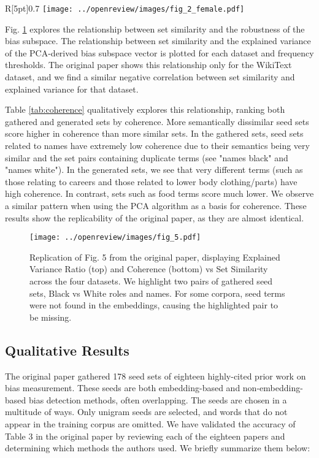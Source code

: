 \begin{wrapfigure}{R}[5pt]{0.7\textwidth}
	\centering
	\texttt{[image: ../openreview/images/fig\_2\_female.pdf]}
	\caption{\label{fig:repro_2}Reproduction of Fig. 2. Displaying the cosine similarity between the averaged vector of \textit{unpleasantness} across all 20 bootstrapped models and different seeds sets of the category \textit{female}.}
\end{wrapfigure}

Fig. \ref{fig:repro_5} explores the relationship between set similarity and the robustness of the
bias subspace. The relationship between set similarity and the explained variance of the PCA-derived
bias subspace vector is plotted for each dataset and frequency thresholds. The original paper shows
this relationship only for the WikiText dataset, and we find a similar negative correlation between
set similarity and explained variance for that dataset.

Table \ref{tab:coherence} qualitatively explores this relationship, ranking both gathered and
generated sets by coherence. More semantically dissimilar seed sets score higher in coherence than
more similar sets. In the gathered sets, seed sets related to names have extremely low coherence due
to their semantics being very similar and the set pairs containing duplicate terms (see "names
black" and "names white"). In the generated sets, we see that very different terms (such as those
relating to careers and those related to lower body clothing/parts) have high coherence. In
contrast, sets such as food terms score much lower. We observe a similar pattern when using the PCA
algorithm as a basis for coherence. These results show the replicability of the original paper, as
they are almost identical.

\begin{figure}[b]
	\centering
	\texttt{[image: ../openreview/images/fig\_5.pdf]}
	\caption{\label{fig:repro_5}Replication of Fig. 5 from the original paper, displaying Explained Variance Ratio (top) and Coherence (bottom) vs Set Similarity across the four datasets. We highlight two pairs of gathered seed sets, Black vs White roles and names. For some corpora, seed terms were not found in the embeddings, causing the highlighted pair to be missing.}
\end{figure}

\subsection{Qualitative Results} The original paper gathered 178 seed sets of eighteen highly-cited
prior work on bias measurement. These seeds are both embedding-based and non-embedding-based bias
detection methods, often overlapping. The seeds are chosen in a multitude of ways. Only unigram
seeds are selected, and words that do not appear in the training corpus are omitted. We have
validated the accuracy of Table 3 in the original paper by reviewing each of the eighteen papers and
determining which methods the authors used. We briefly summarize them below:

